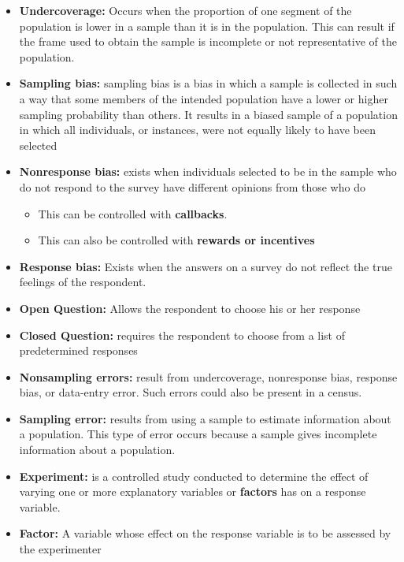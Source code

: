 \documentclass{report}
\begin{document}
\begin{itemize}
            \item \textbf{Undercoverage:} Occurs when the proportion of one segment of the population is lower in a sample than it is in the population. This can result if the frame used to obtain the sample is incomplete or not representative of the population.
            \item \textbf{Sampling bias:} sampling bias is a bias in which a sample is collected in such a way that some members of the intended population have a lower or higher sampling probability than others. It results in a biased sample of a population in which all individuals, or instances, were not equally likely to have been selected
            \item \textbf{Nonresponse bias:} exists when individuals selected to be in the sample who do not respond to the survey have different opinions from those who do
                \begin{itemize}
                    \item This can be controlled with \textbf{callbacks}.
                    \item This can also be controlled with \textbf{rewards or incentives}
                \end{itemize}
            \item \textbf{Response bias:} Exists when the answers on a survey do not reflect the true feelings of the respondent.
            \item \textbf{Open Question:} Allows the respondent to choose his or her response
            \item \textbf{Closed Question:} requires the respondent to choose from a list of predetermined responses
            \item \textbf{Nonsampling errors:} result from undercoverage, nonresponse bias, response bias, or data-entry error. Such errors could also be present in a census.
            \item \textbf{Sampling error:} results from using a sample to estimate information about a population. This type of error occurs because a sample gives incomplete information about a population.
            \item \textbf{Experiment:} is a controlled study conducted to determine the effect of varying one or more explanatory variables or \textbf{factors} has on a response variable. 
            \item \textbf{Factor:} A variable whose effect on the response variable is to be assessed by the experimenter

\end{itemize}
\end{document}
